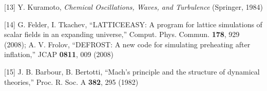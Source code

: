 \documentclass[
  a4paper,
]{article}
\begin{document}
{[}13{]} Y. Kuramoto, \emph{Chemical Oscillations, Waves, and
Turbulence} (Springer, 1984)

{[}14{]} G. Felder, I. Tkachev, ``LATTICEEASY: A program for lattice
simulations of scalar fields in an expanding universe,'' Comput. Phys.
Commun. \textbf{178}, 929 (2008); A. V. Frolov, ``DEFROST: A new code
for simulating preheating after inflation,'' JCAP \textbf{0811}, 009
(2008)

{[}15{]} J. B. Barbour, B. Bertotti, ``Mach's principle and the
structure of dynamical theories,'' Proc. R. Soc. A \textbf{382}, 295
(1982)
\end{document}

